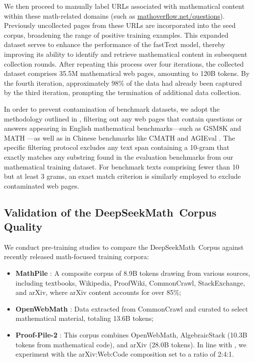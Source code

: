 \begin{itemize}[topsep=0pt]
We then proceed to manually label URLs associated with mathematical content within these math-related domains (such as \url{mathoverflow.net/questions}). Previously uncollected pages from these URLs are incorporated into the seed corpus, broadening the range of positive training examples. This expanded dataset serves to enhance the performance of the fastText model, thereby improving its ability to identify and retrieve mathematical content in subsequent collection rounds. After repeating this process over four iterations, the collected dataset comprises 35.5M mathematical web pages, amounting to 120B tokens. By the fourth iteration, approximately 98\% of the data had already been captured by the third iteration, prompting the termination of additional data collection.

In order to prevent contamination of benchmark datasets, we adopt the methodology outlined in \cite{deepseek-coder}, filtering out any web pages that contain questions or answers appearing in English mathematical benchmarks—such as GSM8K \citep{gsm8k} and MATH \citep{MATH}—as well as in Chinese benchmarks like CMATH \citep{wei2023cmath} and AGIEval \citep{agieval}. The specific filtering protocol excludes any text span containing a 10-gram that exactly matches any substring found in the evaluation benchmarks from our mathematical training dataset. For benchmark texts comprising fewer than 10 but at least 3 grams, an exact match criterion is similarly employed to exclude contaminated web pages.

\subsection{Validation of the DeepSeekMath~Corpus Quality}

We conduct pre-training studies to compare the DeepSeekMath~Corpus against recently released math-focused training corpora:

\begin{itemize}[topsep=0pt]
    \item \textbf{MathPile} \citep{mathpile}: A composite corpus of 8.9B tokens drawing from various sources, including textbooks, Wikipedia, ProofWiki, CommonCrawl, StackExchange, and arXiv, where arXiv content accounts for over 85\%;
    \item \textbf{OpenWebMath} \citep{openwebmath}: Data extracted from CommonCrawl and curated to select mathematical material, totaling 13.6B tokens;
    \item \textbf{Proof-Pile-2} \citep{llemma}: This corpus combines OpenWebMath, AlgebraicStack (10.3B tokens from mathematical code), and arXiv (28.0B tokens). In line with \cite{llemma}, we experiment with the arXiv:Web:Code composition set to a ratio of 2:4:1.
\end{itemize}


\end{itemize}
